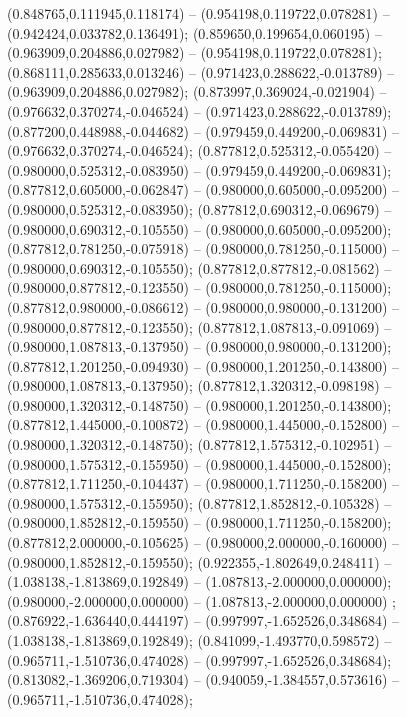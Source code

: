  (0.848765,0.111945,0.118174) -- (0.954198,0.119722,0.078281) -- (0.942424,0.033782,0.136491);
 (0.859650,0.199654,0.060195) -- (0.963909,0.204886,0.027982) -- (0.954198,0.119722,0.078281);
 (0.868111,0.285633,0.013246) -- (0.971423,0.288622,-0.013789) -- (0.963909,0.204886,0.027982);
 (0.873997,0.369024,-0.021904) -- (0.976632,0.370274,-0.046524) -- (0.971423,0.288622,-0.013789);
 (0.877200,0.448988,-0.044682) -- (0.979459,0.449200,-0.069831) -- (0.976632,0.370274,-0.046524);
 (0.877812,0.525312,-0.055420) -- (0.980000,0.525312,-0.083950) -- (0.979459,0.449200,-0.069831);
 (0.877812,0.605000,-0.062847) -- (0.980000,0.605000,-0.095200) -- (0.980000,0.525312,-0.083950);
 (0.877812,0.690312,-0.069679) -- (0.980000,0.690312,-0.105550) -- (0.980000,0.605000,-0.095200);
 (0.877812,0.781250,-0.075918) -- (0.980000,0.781250,-0.115000) -- (0.980000,0.690312,-0.105550);
 (0.877812,0.877812,-0.081562) -- (0.980000,0.877812,-0.123550) -- (0.980000,0.781250,-0.115000);
 (0.877812,0.980000,-0.086612) -- (0.980000,0.980000,-0.131200) -- (0.980000,0.877812,-0.123550);
 (0.877812,1.087813,-0.091069) -- (0.980000,1.087813,-0.137950) -- (0.980000,0.980000,-0.131200);
 (0.877812,1.201250,-0.094930) -- (0.980000,1.201250,-0.143800) -- (0.980000,1.087813,-0.137950);
 (0.877812,1.320312,-0.098198) -- (0.980000,1.320312,-0.148750) -- (0.980000,1.201250,-0.143800);
 (0.877812,1.445000,-0.100872) -- (0.980000,1.445000,-0.152800) -- (0.980000,1.320312,-0.148750);
 (0.877812,1.575312,-0.102951) -- (0.980000,1.575312,-0.155950) -- (0.980000,1.445000,-0.152800);
 (0.877812,1.711250,-0.104437) -- (0.980000,1.711250,-0.158200) -- (0.980000,1.575312,-0.155950);
 (0.877812,1.852812,-0.105328) -- (0.980000,1.852812,-0.159550) -- (0.980000,1.711250,-0.158200);
 (0.877812,2.000000,-0.105625) -- (0.980000,2.000000,-0.160000) -- (0.980000,1.852812,-0.159550);
 (0.922355,-1.802649,0.248411) -- (1.038138,-1.813869,0.192849) -- (1.087813,-2.000000,0.000000);
 (0.980000,-2.000000,0.000000) -- (1.087813,-2.000000,0.000000) ;
 (0.876922,-1.636440,0.444197) -- (0.997997,-1.652526,0.348684) -- (1.038138,-1.813869,0.192849);
 (0.841099,-1.493770,0.598572) -- (0.965711,-1.510736,0.474028) -- (0.997997,-1.652526,0.348684);
 (0.813082,-1.369206,0.719304) -- (0.940059,-1.384557,0.573616) -- (0.965711,-1.510736,0.474028);
